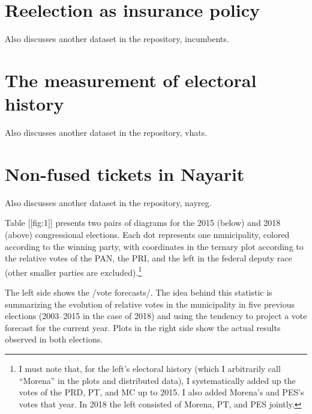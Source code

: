 \documentclass[letter,12pt]{article}
\begin{document}
\section{Reelection as insurance policy}
Also discusses another dataset in the repository, incumbents. \citep{motolinia-reel-pork2021,lucardi.rosas.Incumbency.2016}

\section{The measurement of electoral history}
Also discusses another dataset in the repository, vhats.

\section{Non-fused tickets in Nayarit}
Also discusses another dataset in the repository, nayreg.

Table [[fig:1]] presents two pairs of diagrams for the 2015 (below) and 2018 (above) congressional elections. Each dot represents one municipality, colored according to the winning party, with coordinates in the ternary plot according to the relative votes of the PAN, the PRI, and the left in the federal deputy race (other smaller parties are excluded).\footnote{I must note that, for the left's electoral history (which I arbitrarily call ``Morena'' in the plots and distributed data), I systematically added up the votes of the PRD, PT, and MC up to 2015. I also added Morena's and PES's votes that year. In 2018 the left consisted of Morena, PT, and PES jointly.} 


The left side shows the /vote forecasts/. The idea behind this statistic is summarizing the evolution of relative votes in the municipality in five previous elections (2003--2015 in the case of 2018) and using the tendency to project a vote forecast for the current year. Plots in the right side show the actual results observed in both elections.
\end{document}
